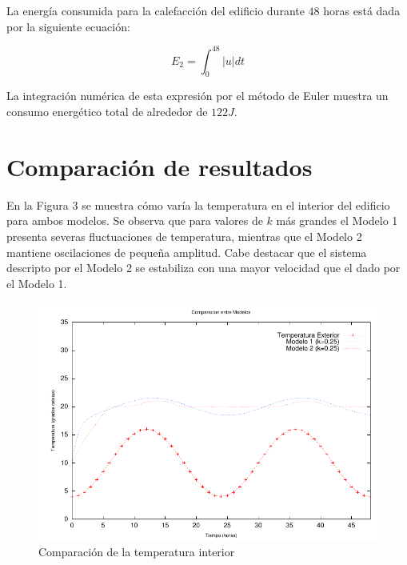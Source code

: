 \documentclass{sig-alternate}
\begin{document}
La energ\'{i}a consumida para la calefacci\'{o}n del edificio durante $48$ horas
est\'{a} dada por la siguiente ecuaci\'{o}n:

\begin{equation}
\label{energia_segundo_modelo}
E_{2} = \int_{0}^{48} | u | dt
\end{equation}

La integraci\'{o}n num\'{e}rica de esta expresi\'{o}n por el m\'{e}todo de
Euler muestra un consumo energ\'{e}tico total de alrededor de $122J$.

\section{Comparaci\'{o}n de resultados}\label{resultados}

En la Figura $3$ se muestra c\'{o}mo var\'{i}a 
la temperatura en el interior del edificio para ambos modelos. Se observa
que para valores de $k$ m\'{a}s grandes el Modelo 1 presenta severas
fluctuaciones de temperatura, mientras que el Modelo 2 mantiene oscilaciones
de peque\~{n}a amplitud. Cabe destacar que el sistema descripto por el Modelo 2 
se estabiliza con una mayor velocidad que el dado por el Modelo 1.

\begin{figure}[hp]
\label{comparacion_temp_interior}
\centering
\includegraphics[scale=1.05]{graficos/ej1c}
\caption{Comparaci\'{o}n de la temperatura interior}
\end{figure}
\end{document}
